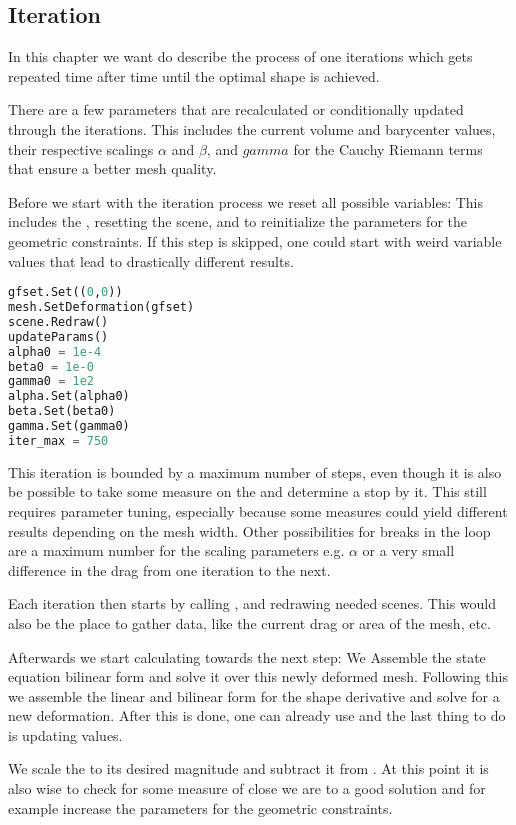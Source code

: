 \subsection{Iteration}
In this chapter we want do describe the process of one iterations which gets repeated time after time until the optimal shape is achieved.

There are a few parameters that are recalculated or conditionally updated through the iterations. This includes the current volume and barycenter values, their respective scalings $\alpha$ and $\beta$, and $gamma$ for the Cauchy Riemann terms that ensure a better mesh quality.

Before we start with the iteration process we reset all possible variables:
This includes the , resetting the scene, and to reinitialize the parameters for the geometric constraints. If this step is skipped, one could start with weird variable values that lead to drastically different results.

\begin{lstlisting}[language=Python, title=Reset before iteration, label=lst:reset]
gfset.Set((0,0))
mesh.SetDeformation(gfset)
scene.Redraw()
updateParams()
alpha0 = 1e-4
beta0 = 1e-0
gamma0 = 1e2
alpha.Set(alpha0)
beta.Set(beta0)
gamma.Set(gamma0)
iter_max = 750
\end{lstlisting}

This iteration is bounded by a maximum number of steps, even though it is also be possible to take some measure on the  and determine a stop by it.
This still requires parameter tuning, especially because some measures could yield different results depending on the mesh width.
Other possibilities for breaks in the loop are a maximum number for the scaling parameters e.g. $\alpha$ or a very small difference in the drag from one iteration to the next.

Each iteration then starts by calling , and redrawing needed scenes. This would also be the place to gather data, like the current drag or area of the mesh, etc.

Afterwards we start calculating towards the next step:
We Assemble the state equation bilinear form and solve it over this newly deformed mesh. Following this we assemble the linear and bilinear form for the shape derivative and solve for a new deformation. After this is done, one can already use  and the last thing to do is updating values.

We scale the  to its desired magnitude and subtract it from . At this point it is also wise to check for some measure of close we are to a good solution and for example increase the parameters for the geometric constraints.

